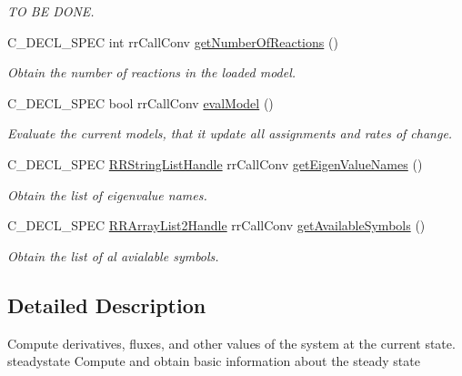 \begin{DoxyCompactItemize}
\begin{DoxyCompactList}\small\item\em \-T\-O \-B\-E \-D\-O\-N\-E. \end{DoxyCompactList}\item 
\-C\-\_\-\-D\-E\-C\-L\-\_\-\-S\-P\-E\-C int rr\-Call\-Conv \hyperlink{group__utility_gae25399f84ff2d1fda619358a1af9a1b5}{get\-Number\-Of\-Reactions} ()
\begin{DoxyCompactList}\small\item\em \-Obtain the number of reactions in the loaded model. \end{DoxyCompactList}\item 
\-C\-\_\-\-D\-E\-C\-L\-\_\-\-S\-P\-E\-C bool rr\-Call\-Conv \hyperlink{group__utility_ga3fbb7c2fab261f25a3871f1caf398ff1}{eval\-Model} ()
\begin{DoxyCompactList}\small\item\em \-Evaluate the current models, that it update all assignments and rates of change. \end{DoxyCompactList}\item 
\-C\-\_\-\-D\-E\-C\-L\-\_\-\-S\-P\-E\-C \hyperlink{rr__c__types_8h_abf561b014879247b7b92ee99c205de21}{\-R\-R\-String\-List\-Handle} \*
rr\-Call\-Conv \hyperlink{group__utility_ga313f81d4fae0ece305eb1246543bcdc3}{get\-Eigen\-Value\-Names} ()
\begin{DoxyCompactList}\small\item\em \-Obtain the list of eigenvalue names. \end{DoxyCompactList}\item 
\-C\-\_\-\-D\-E\-C\-L\-\_\-\-S\-P\-E\-C \hyperlink{rr__c__types_8h_a21a10f01ac4fd34c61e7e7d12af9891d}{\-R\-R\-Array\-List2\-Handle} \*
rr\-Call\-Conv \hyperlink{group__utility_gaa06a430f57d4df400e58fd954766901c}{get\-Available\-Symbols} ()
\begin{DoxyCompactList}\small\item\em \-Obtain the list of al avialable symbols. \end{DoxyCompactList}\end{DoxyCompactItemize}


\subsection{\-Detailed \-Description}
\-Compute derivatives, fluxes, and other values of the system at the current state. steadystate \-Compute and obtain basic information about the steady state 

